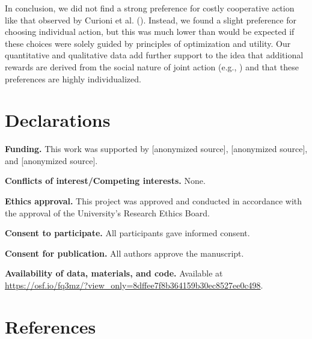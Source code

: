 \documentclass[
  man,
  floatsintext,
  longtable,
  nolmodern,
  notxfonts,
  notimes,
  mask,
  colorlinks=true,linkcolor=blue,citecolor=blue,urlcolor=blue]{apa7}
\begin{document}
In conclusion, we did not find a strong preference for costly
cooperative action like that observed by Curioni et al.
(). Instead, we found a slight
preference for choosing individual action, but this was much lower than
would be expected if these choices were solely guided by principles of
optimization and utility. Our quantitative and qualitative data add
further support to the idea that additional rewards are derived from the
social nature of joint action (e.g., ) and that these preferences are highly individualized.

\vfill

\section{Declarations}\label{declarations}

\noindent \textbf{Funding.} \space This work was supported by
{[}anonymized source{]}, {[}anonymized source{]}, and {[}anonymized
source{]}.

\noindent \textbf{Conflicts of interest/Competing interests.}
\space None.

\noindent \textbf{Ethics approval.} \space This project was approved and
conducted in accordance with the approval of the University's Research
Ethics Board.

\noindent \textbf{Consent to participate.} \space All participants gave
informed consent.

\noindent \textbf{Consent for publication.} \space All authors approve
the manuscript.

\noindent \textbf{Availability of data, materials, and code.}
\space Available at
\url{https://osf.io/fq3mz/?view_only=8dffee7f8b364159b30ec8527ee0c498}.

\newpage

\section{References}\label{references}
\end{document}
